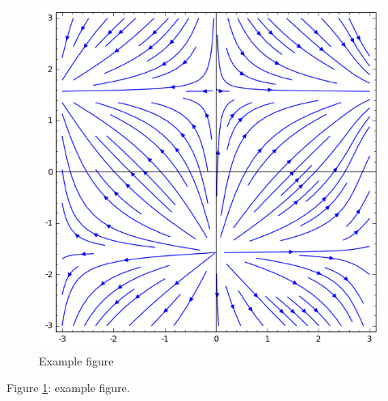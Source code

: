 \documentclass{article}
\numberwithin{equation}{section}
\begin{document}
  \begin{figure}[h!]
  \begin{center}

    \includegraphics[scale=.75]{plot_5}
    \caption{Example figure}

    \label{fig:atom}
  \end{center}
  \end{figure}

Figure \ref{fig:atom}: example figure.
\end{document}

